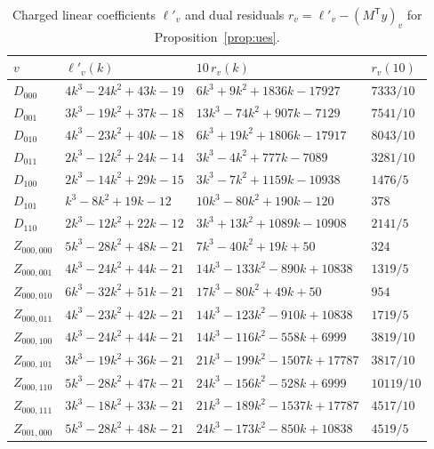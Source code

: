 \documentclass[11pt]{amsart}
\theoremstyle{definition}
\theoremstyle{remark}
\newcommand{\1}{\mathbf 1}
\begin{document}
{\footnotesize\begin{longtable}{@{}llll@{}}
\caption{Charged linear coefficients $\ell'_v$ and dual residuals $r_v=\ell'_v-(M^{\mathsf T}y)_v$ for Proposition~\ref{prop:ues}.}\\
\toprule $v$ & $\ell'_v(k)$ & $10\,r_v(k)$ & $r_v(10)$\\ \midrule \endhead
$D_{000}$ & $4 k^{3} - 24 k^{2} + 43 k - 19$ & $6 k^{3} + 9 k^{2} + 1836 k - 17927$ & $7333 / 10$\\
$D_{001}$ & $3 k^{3} - 19 k^{2} + 37 k - 18$ & $13 k^{3} - 74 k^{2} + 907 k - 7129$ & $7541 / 10$\\
$D_{010}$ & $4 k^{3} - 23 k^{2} + 40 k - 18$ & $6 k^{3} + 19 k^{2} + 1806 k - 17917$ & $8043 / 10$\\
$D_{011}$ & $2 k^{3} - 12 k^{2} + 24 k - 14$ & $3 k^{3} - 4 k^{2} + 777 k - 7089$ & $3281 / 10$\\
$D_{100}$ & $2 k^{3} - 14 k^{2} + 29 k - 15$ & $3 k^{3} - 7 k^{2} + 1159 k - 10938$ & $1476 / 5$\\
$D_{101}$ & $k^{3} - 8 k^{2} + 19 k - 12$ & $10 k^{3} - 80 k^{2} + 190 k - 120$ & $378$\\
$D_{110}$ & $2 k^{3} - 12 k^{2} + 22 k - 12$ & $3 k^{3} + 13 k^{2} + 1089 k - 10908$ & $2141 / 5$\\
$Z_{000,000}$ & $5 k^{3} - 28 k^{2} + 48 k - 21$ & $7 k^{3} - 40 k^{2} + 19 k + 50$ & $324$\\
$Z_{000,001}$ & $4 k^{3} - 24 k^{2} + 44 k - 21$ & $14 k^{3} - 133 k^{2} - 890 k + 10838$ & $1319 / 5$\\
$Z_{000,010}$ & $6 k^{3} - 32 k^{2} + 51 k - 21$ & $17 k^{3} - 80 k^{2} + 49 k + 50$ & $954$\\
$Z_{000,011}$ & $4 k^{3} - 23 k^{2} + 42 k - 21$ & $14 k^{3} - 123 k^{2} - 910 k + 10838$ & $1719 / 5$\\
$Z_{000,100}$ & $4 k^{3} - 24 k^{2} + 44 k - 21$ & $14 k^{3} - 116 k^{2} - 558 k + 6999$ & $3819 / 10$\\
$Z_{000,101}$ & $3 k^{3} - 19 k^{2} + 36 k - 21$ & $21 k^{3} - 199 k^{2} - 1507 k + 17787$ & $3817 / 10$\\
$Z_{000,110}$ & $5 k^{3} - 28 k^{2} + 47 k - 21$ & $24 k^{3} - 156 k^{2} - 528 k + 6999$ & $10119 / 10$\\
$Z_{000,111}$ & $3 k^{3} - 18 k^{2} + 33 k - 21$ & $21 k^{3} - 189 k^{2} - 1537 k + 17787$ & $4517 / 10$\\
$Z_{001,000}$ & $5 k^{3} - 28 k^{2} + 48 k - 21$ & $24 k^{3} - 173 k^{2} - 850 k + 10838$ & $4519 / 5$\\

\end{longtable}}
\end{document}
